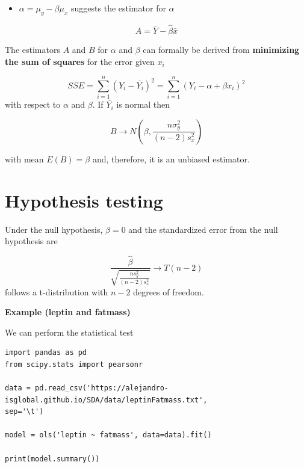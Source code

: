\documentclass[
]{book}
\providecommand{\tightlist}{%
  \setlength{\itemsep}{0pt}\setlength{\parskip}{0pt}}
\begin{document}
\begin{itemize}
\tightlist
\item
  \(\alpha=\mu_y-\beta\mu_x\) suggests the estimator for \(\alpha\)
\end{itemize}

\[A=\bar{Y}- \hat{\beta}\bar{x}\]

The estimators \(A\) and \(B\) for \(\alpha\) and \(\beta\) can formally be derived from \textbf{minimizing the sum of squares} for the error given \(x_i\)

\[SSE=\sum_{i=1}^n(Y_i-\bar{Y_i})^2=\sum_{i=1}^n(Y_i-\alpha + \beta x_i)^2\]
with respect to \(\alpha\) and \(\beta\). If \(\bar{Y_i}\) is normal then

\[B \rightarrow N(\beta, \frac{n\sigma^2_y}{{(n-2)s^2_x}})\]

with mean \(E(B)=\beta\) and, therefore, it is an unbiased estimator.

\hypertarget{hypothesis-testing-2}{%
\section{Hypothesis testing}\label{hypothesis-testing-2}}

Under the null hypothesis, \(\beta=0\) and the standardized error from the null hypothesis are

\[\frac{\hat{\beta}}{\sqrt{\frac{ns^2_y}{{(n-2)s^2_x}}}} \rightarrow T(n-2)\]
follows a t-distribution with \(n-2\) degrees of freedom.

\textbf{Example (leptin and fatmass)}

We can perform the statistical test

\begin{verbatim}
import pandas as pd
from scipy.stats import pearsonr

data = pd.read_csv('https://alejandro-isglobal.github.io/SDA/data/leptinFatmass.txt', 
sep='\t')

model = ols('leptin ~ fatmass', data=data).fit()

print(model.summary())
\end{verbatim}
\end{document}
